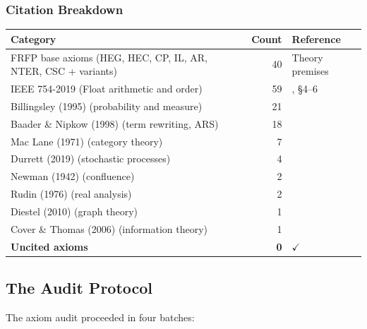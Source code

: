 \subsubsection*{Citation Breakdown}

\begin{center}
\begin{tabular}{p{7.5cm}rl}
\toprule
Category & Count & Reference \\
\midrule
FRFP base axioms (HEG, HEC, CP, IL, AR, NTER, CSC + variants) & 40 & Theory premises \\
IEEE 754-2019 (Float arithmetic and order) & 59 & \cite{IEEE754_2019}, \S4--6 \\
Billingsley (1995) (probability and measure) & 21 & \cite{Billingsley1995} \\
Baader \& Nipkow (1998) (term rewriting, ARS) & 18 & \cite{BaaderNipkow1998} \\
Mac Lane (1971) (category theory) & 7 & \cite{MacLane1971} \\
Durrett (2019) (stochastic processes) & 4 & \cite{Durrett2019} \\
Newman (1942) (confluence) & 2 & \cite{Newman1942} \\
Rudin (1976) (real analysis) & 2 & \cite{Rudin1976} \\
Diestel (2010) (graph theory) & 1 & \cite{Diestel2010} \\
Cover \& Thomas (2006) (information theory) & 1 & \cite{CoverThomas2006} \\
\textbf{Uncited axioms} & \textbf{0} & $\checkmark$ \\
\bottomrule
\end{tabular}
\end{center}

\subsection{The Audit Protocol}

The axiom audit proceeded in four batches:

